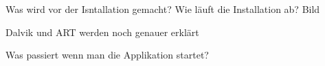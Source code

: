 Was wird vor der Isntallation gemacht?
Wie läuft die Installation ab? Bild

Dalvik und ART werden noch genauer erklärt

Was passiert wenn man die Applikation startet?
